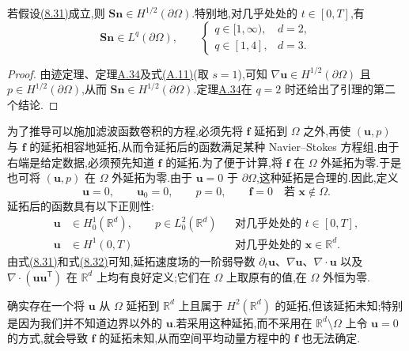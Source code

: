 \begin{lemma}
\label{lem:les-normal-stress-regularity}
若假设\hyperref[eq:les-bounded-domain-regularity]{(8.31)}成立,则
$\bm{S}\bm{n}\in H^{1/2}(\partial\Omega)$.特别地,对几乎处处的
$t\in[0,T]$,有
\[
 \bm{S}\bm{n}\in L^q(\partial\Omega),
 \qquad
 \begin{cases}
  q\in[1,\infty),&d=2,\\
  q\in[1,4],&d=3.
 \end{cases}
\]
\end{lemma}
\begin{proof}
由迹定理、定理\hyperref[thm:appendix-a-34]{A.34}及式\hyperref[eq:appendix-a-11]{(A.11)}(取 $s=1$),可知 $\nabla\bm{u}\in H^{1/2}(\partial\Omega)$ 且 $p\in H^{1/2}(\partial\Omega)$,从而 $\bm{S}\bm{n}\in H^{1/2}(\partial\Omega)$.定理\hyperref[thm:appendix-a-34]{A.34}在 $q=2$ 时还给出了引理的第二个结论.
\end{proof}

\begin{note}
\label{note:les-function-extensions}
为了推导可以施加滤波函数卷积的方程,必须先将 $\bm{f}$ 延拓到 $\Omega$ 之外,再使 $(\bm{u},p)$ 与 $\bm{f}$ 的延拓相容地延拓,从而令延拓后的函数满足某种 Navier--Stokes 方程组.由于右端是给定数据,必须预先知道 $\bm{f}$ 的延拓.为了便于计算,将 $\bm{f}$ 在 $\Omega$ 外延拓为零.于是也可将 $(\bm{u},p)$ 在 $\Omega$ 外延拓为零.由于 $\bm{u}=0$ 于 $\partial\Omega$,这种延拓是合理的.因此,定义
\[
 \bm{u}=0,\qquad
 \bm{u}_0=0,\qquad
 p=0,\qquad
 \bm{f}=0
 \quad\text{若 }\bm{x}\notin\Omega.
\]
延拓后的函数具有以下正则性:
\begin{equation}\label{eq:les-zero-extension-regularity}
\begin{aligned}
 \bm{u}&\in H_0^1(\mathbb{R}^d),\qquad
 p\in L_0^2(\mathbb{R}^d)
 &&\text{对几乎处处的 }t\in[0,T],\\
 \bm{u}&\in H^1(0,T)
 &&\text{对几乎处处的 }\bm{x}\in\mathbb{R}^d.
\end{aligned}
\end{equation}
由式\hyperref[eq:les-bounded-domain-regularity]{(8.31)}和式\hyperref[eq:les-zero-extension-regularity]{(8.32)}可知,延拓速度场的一阶弱导数 $\partial_t\bm{u}$、$\nabla\bm{u}$、$\nabla\cdot\bm{u}$ 以及 $\nabla\cdot(\bm{u}\bm{u}^{\mathsf T})$ 在 $\mathbb{R}^d$ 上均有良好定义;它们在 $\Omega$ 上取原有的值,在 $\Omega$ 外恒为零.

确实存在一个将 $\bm{u}$ 从 $\Omega$ 延拓到 $\mathbb{R}^d$ 上且属于 $H^2(\mathbb{R}^d)$ 的延拓,但该延拓未知;特别是因为我们并不知道边界以外的 $\bm{u}$.若采用这种延拓,而不采用在 $\mathbb{R}^d\setminus\Omega$ 上令 $\bm{u}=0$ 的方式,就会导致 $\bm{f}$ 的延拓未知,从而空间平均动量方程中的 $\bm{f}$ 也无法确定.
\end{note}

